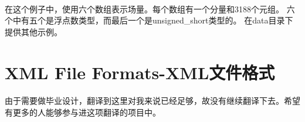 \documentclass[UTF8]{ctexart}
\begin{document}
\paragraph{\quad}在这个例子中，使用六个数组表示场量。每个数组有一个分量和3188个元组。
                六个中有五个是浮点数类型，而最后一个是unsigned_short类型的。
                在data目录下提供其他示例。

\section*{XML File Formats-XML文件格式}
\paragraph{\quad}由于需要做毕业设计，翻译到这里对我来说已经足够，故没有继续翻译下去。希望
                有更多的人能够参与进这项翻译的项目中。
\end{document}
